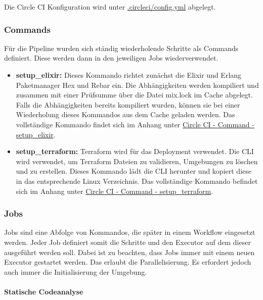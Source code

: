 Die Circle CI Konfiguration wird unter \hyperref[lst:circle_orbs_and_executors]{.circleci/config.yml} abgelegt.

\subsubsection{Commands}

Für die Pipeline wurden sich ständig wiederholende Schritte als Commands definiert.
Diese werden dann in den jeweiligen Jobs wiederverwendet.

\begin{itemize}
  \item \textbf{setup\_elixir:}
  Dieses Kommando richtet zunächst die Elixir und Erlang Paketmanager Hex und Rebar ein.
  Die Abhängigkeiten werden kompiliert und zusammen mit einer Prüfsumme über die Datei mix.lock im Cache abgelegt.
  Falls die Abhängigkeiten bereits kompiliert wurden, können sie bei einer Wiederholung dieses Kommandos aus dem Cache geladen werden.
  Das vollständige Kommando findet sich im Anhang unter \hyperref[lst:circle_command_setup_elixir]{Circle CI - Command - setup\_elixir}.

  \item \textbf{setup\_terraform:}
  Terraform wird für das Deployment verwendet.
  Die CLI wird verwendet, um Terraform Dateien zu validieren, Umgebungen zu löschen und zu erstellen.
  Dieses Kommando lädt die CLI herunter und kopiert diese in das entsprechende Linux Verzeichnis.
  Das vollständige Kommando befindet sich im Anhang unter \hyperref[lst:circle_command_setup_terraform]{Circle CI - Command - setup\_terraform}.

\end{itemize}

\subsubsection{Jobs}

Jobs sind eine Abfolge von Kommandos, die später in einem Workflow eingesetzt werden.
Jeder Job definiert somit die Schritte und den Executor auf dem dieser ausgeführt werden soll.
Dabei ist zu beachten, dass Jobs immer mit einem neuen Executor gestartet werden.
Das erlaubt die Parallelisierung.
Es erfordert jedoch auch immer die Initialisierung der Umgebung.

\paragraph{Statische Codeanalyse}

